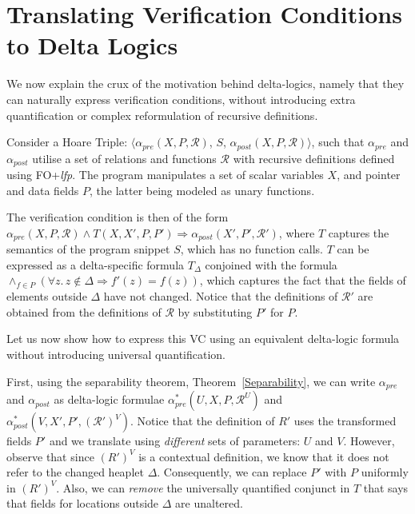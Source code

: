 	\section{Translating Verification Conditions to Delta Logics}
\label{sec:VC2Delta}	
	We now explain the crux of the motivation behind delta-logics, namely that they can naturally express verification conditions,
	without introducing extra quantification or complex reformulation of recursive definitions.
	
Consider a Hoare Triple: $\langle \alpha_{\textit{pre}}(X, P, \mathcal{R})$, $S$, $\alpha_{\textit{post}}(X, P, \mathcal{R})\rangle$,
such that $\alpha_{pre}$ and $\alpha_{post}$ utilise a set of relations and functions $\mathcal{R}$ with recursive definitions defined using FO+\textit{lfp}. 
The program manipulates a set of scalar variables $X$, and pointer and data fields $P$, the latter being modeled as unary functions. 

The verification condition is then of the form $\alpha_{\textit{pre}}(X, P, \mathcal{R}) \land{} T(X, X', P, P') \Rightarrow 
\alpha_{\textit{post}} (X', P', \mathcal{R'})$, where $T$ captures the semantics of the program snippet $S$, which has no function calls.
$T$ can be expressed as a delta-specific formula $T_\Delta$ conjoined with the formula 
$\wedge_{f \in{} P} \left(\forall{}z.\,z\notin{}\Delta{} \Rightarrow f'(z) = f(z) \right)$, which captures
the fact that the fields of elements outside $\Delta$ have not changed. Notice that the definitions of $\mathcal{R'}$ are 
obtained from the definitions of $\mathcal{R}$ by substituting $P'$ for $P$.

Let us now show how to express this VC using an equivalent delta-logic formula without introducing universal quantification.

First, using the separability theorem, Theorem~\ref{Separability}, we can write $\alpha_{\textit{pre}}$ and $\alpha_{\textit{post}}$
as delta-logic formulae $\alpha_{\textit{pre}}^*(U, X, P, \mathcal{R}^U)$ and $\alpha_{\textit{post}}^*(V, X', P', \mathcal{(R')}^V)$.
Notice that the definition of $R'$ uses the transformed fields $P'$ and we translate using \emph{different} sets of parameters: $U$
and $V$. However, observe that since $(R')^V$ is a contextual definition, we know that it does not refer to the changed heaplet
$\Delta$. Consequently, we can replace $P'$ with $P$ uniformly in $(R')^V$. Also, we can \emph{remove} the universally
quantified conjunct in $T$ that says that fields for locations outside $\Delta$ are unaltered.


